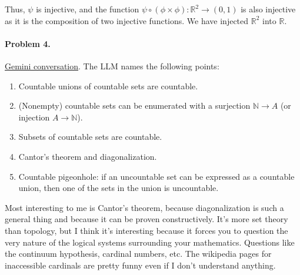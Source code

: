 \documentclass[12pt]{article}
\begin{document}
Thus, $\psi$ is injective, and the function $\psi \circ (\phi \times \phi) : \mathbb R^2 \to (0, 1)$ is also injective as it is the composition of two injective functions. We have injected $\mathbb R^2$ into $\mathbb R$.

\paragraph{Problem 4.}

\href{https://share.gemini.google/AzmKuT1Kbsdf}{Gemini conversation}. The LLM names the following points:
\begin{enumerate}
    \item Countable unions of countable sets are countable.
    \item (Nonempty) countable sets can be enumerated with a surjection $\mathbb N \to A$ (or injection $A \to \mathbb N$).
    \item Subsets of countable sets are countable.
    \item Cantor's theorem and diagonalization.
    \item Countable pigeonhole: if an uncountable set can be expressed as a countable union, then one of the sets in the union is uncountable.
\end{enumerate}

Most interesting to me is Cantor's theorem, because diagonalization is such a general thing and because it can be proven constructively. It's more set theory than topology, but I think it's interesting because it forces you to question the very nature of the logical systems surrounding your mathematics. Questions like the continuum hypothesis, cardinal numbers, etc. The wikipedia pages for inaccessible cardinals are pretty funny even if I don't understand anything.
\end{document}
